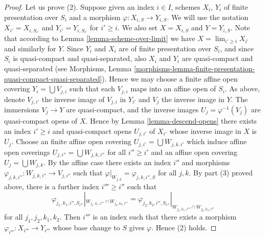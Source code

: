 \begin{proof}
\medskip\noindent
Let us prove (2). Suppose given an index $i \in I$, schemes
$X_i$, $Y_i$ of finite presentation over $S_i$ and a morphism
$\varphi : X_{i, S} \to Y_{i, S}$. We will use the notation
$X_{i'} = X_{i, S_{i'}}$ and $Y_{i'} = Y_{i, S_{i'}}$ for
$i' \geq i$. We also set $X = X_{i, S}$ and $Y = Y_{i, S}$.
Note that according to Lemma \ref{lemma-scheme-over-limit} we have
$X = \lim_{i' \geq i} X_{i'}$ and similarly for $Y$.
Since $Y_i$ and $X_i$ are of finite presentation
over $S_i$, and since $S_i$ is quasi-compact and quasi-separated, also
$X_i$ and $Y_i$ are quasi-compact and quasi-separated
(see Morphisms,
Lemma \ref{morphisms-lemma-finite-presentation-quasi-compact-quasi-separated}).
Hence we may choose a finite affine open covering
$Y_i = \bigcup V_{j, i}$ such that each $V_{j, i}$ maps into
an affine open of $S_i$. As above, denote $V_{j, i'}$ the inverse
image of $V_{j, i}$ in $Y_{i'}$ and $V_j$ the inverse image in $Y$.
The immersions $V_j \to Y$ are quasi-compact, and the inverse images
$U_j = \varphi^{-1}(V_j)$ are quasi-compact opens of $X$.
Hence by Lemma \ref{lemma-descend-opens} there exists an index
$i' \geq i$ and quasi-compact opens $U_{j, i'}$ of $X_{i'}$
whose inverse image in $X$ is $U_j$. Choose an finite affine open covering
$U_{j, i'} = \bigcup W_{j, k, i'}$ which induce affine open
coverings $U_{j, i''} = \bigcup W_{j, k, i''}$
for all $i'' \geq i'$ and an affine open covering
$U_j = \bigcup W_{j, k}$. By the affine case there exists
an index $i''$ and morphisms
$\varphi_{j, k, i''} : W_{j, k, i''} \to V_{j, i''}$
such that
$\varphi|_{W_{j, k}} = \varphi_{j, k, i'', S}$ for all $j, k$.
By part (3) proved above, there is a further index $i''' \geq i''$
such that
$$
\varphi_{j_1, k_1, i'', S_{i'''}}|_{W_{j_1, k_1, i'''} \cap W_{j_2, k_2, i'''}}
=
\varphi_{j_2, k_2, i'', S_{i'''}}|_{W_{j_1, k_1, i'''} \cap W_{j_2, k_2, i'''}}
$$
for all $j_1, j_2, k_1, k_2$. Then $i'''$ is an index such that
there exists a morphism $\varphi_{i'''} : X_{i'''} \to Y_{i'''}$
whose base change to $S$ gives $\varphi$. Hence (2) holds.


\end{proof}
